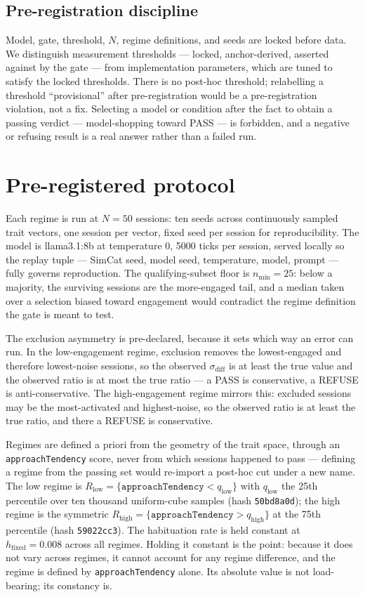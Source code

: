 \documentclass{article}
\begin{document}
\subsection{Pre-registration discipline}

Model, gate, threshold, $N$, regime definitions, and seeds are locked before data. We distinguish measurement thresholds --- locked, anchor-derived, asserted against by the gate --- from implementation parameters, which are tuned to satisfy the locked thresholds. There is no post-hoc threshold; relabelling a threshold ``provisional'' after pre-registration would be a pre-registration violation, not a fix. Selecting a model or condition after the fact to obtain a passing verdict --- model-shopping toward PASS --- is forbidden, and a negative or refusing result is a real answer rather than a failed run.

\section{Pre-registered protocol}

Each regime is run at $N = 50$ sessions: ten seeds across continuously sampled trait vectors, one session per vector, fixed seed per session for reproducibility. The model is llama3.1:8b at temperature 0, 5000 ticks per session, served locally so the replay tuple --- SimCat seed, model seed, temperature, model, prompt --- fully governs reproduction. The qualifying-subset floor is $n_{\min} = 25$: below a majority, the surviving sessions are the more-engaged tail, and a median taken over a selection biased toward engagement would contradict the regime definition the gate is meant to test.

The exclusion asymmetry is pre-declared, because it sets which way an error can run. In the low-engagement regime, exclusion removes the lowest-engaged and therefore lowest-noise sessions, so the observed $\sigma_{\mathrm{diff}}$ is at least the true value and the observed ratio is at most the true ratio --- a PASS is conservative, a REFUSE is anti-conservative. The high-engagement regime mirrors this: excluded sessions may be the most-activated and highest-noise, so the observed ratio is at least the true ratio, and there a REFUSE is conservative.

Regimes are defined a priori from the geometry of the trait space, through an \texttt{approachTendency} score, never from which sessions happened to pass --- defining a regime from the passing set would re-import a post-hoc cut under a new name. The low regime is $R_{\mathrm{low}} = \{\texttt{approachTendency} < q_{\mathrm{low}}\}$ with $q_{\mathrm{low}}$ the 25th percentile over ten thousand uniform-cube samples (hash \texttt{50bd8a0d}); the high regime is the symmetric $R_{\mathrm{high}} = \{\texttt{approachTendency} > q_{\mathrm{high}}\}$ at the 75th percentile (hash \texttt{59022cc3}). The habituation rate is held constant at $h_{\mathrm{fixed}} = 0.008$ across all regimes. Holding it constant is the point: because it does not vary across regimes, it cannot account for any regime difference, and the regime is defined by \texttt{approachTendency} alone. Its absolute value is not load-bearing; its constancy is.
\end{document}
